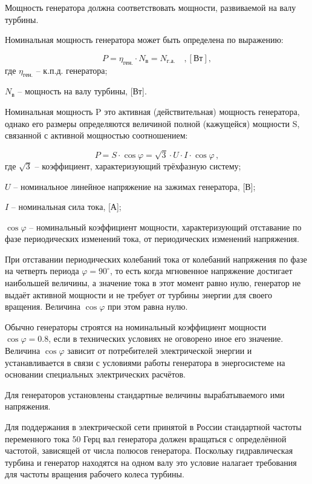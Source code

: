 Мощность генератора должна соответствовать мощности, развиваемой на валу турбины.

Номинальная мощность генератора может быть определена по выражению:

$$
   P = \eta_{\text{ген.}} \cdot N_\text{в} = N_{\text{г.а.}} \quad , [\text{Вт}],
$$
где $\eta_{\text{ген.}}$ -- к.п.д. генератора;

$N_\text{в}$ -- мощность на валу турбины, [Вт].

\vspace{0.5cm}

Номинальная мощность P это активная (действительная) мощность генератора, однако его размеры определяются величиной полной (кажущейся) мощности S, связанной с активной мощностью соотношением:

$$
   P = S \cdot \cos \varphi = \sqrt{3} \cdot U \cdot I \cdot \cos \varphi \, ,
$$
где $\sqrt{3}$ -- коэффициент, характеризующий трёхфазную систему;

$U$ -- номинальное линейное напряжение на зажимах генератора, [В];

$I$ -- номинальная сила тока, [А];

$\cos \varphi$ -- номинальный коэффициент мощности, характеризующий отставание по фазе периодических изменений тока, от периодических изменений напряжения.

\vspace{0.5cm}

При отставании периодических колебаний тока от колебаний напряжения по фазе на четверть периода $\varphi = 90^{\circ}$, то есть когда мгновенное напряжение достигает наибольшей величины, а значение тока в этот момент равно нулю, генератор не выдаёт активной мощности и не требует от турбины энергии для своего вращения. Величина $\cos \varphi$ при этом равна нулю. 

Обычно генераторы строятся на номинальный коэффициент мощности $\cos \varphi = 0.8$, если в технических условиях не оговорено иное его значение. Величина $\cos \varphi$ зависит от потребителей электрической энергии и устанавливается в связи с условиями работы генератора в энергосистеме на основании специальных электрических расчётов.

Для генераторов установлены стандартные величины вырабатываемого ими напряжения.

Для поддержания в электрической сети принятой в России стандартной частоты переменного тока 50 Герц вал генератора должен вращаться с определённой частотой, зависящей от числа полюсов генератора. Поскольку гидравлическая турбина и генератор находятся на одном валу это условие налагает требования для частоты вращения рабочего колеса турбины.

